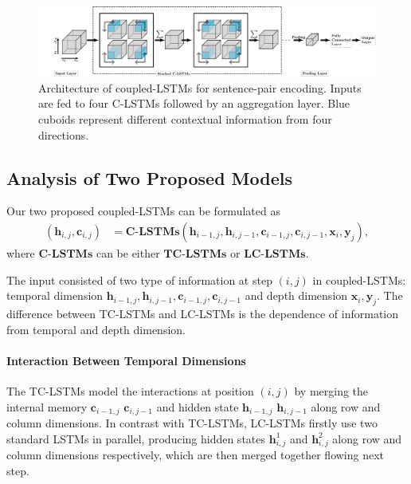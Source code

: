 \documentclass{article}
\def\h{\mathbf{h}}
\def\bx{\mathbf{x}}
\def\by{\mathbf{y}}
\def\cc{\mathbf{c}}
\def\ii{\mathbf{i}}
\def\ff{\mathbf{f}}
\def\oo{\mathbf{o}}
\def\cc{\mathbf{c}}
\begin{document}

\begin{figure}[t]\centering
  \includegraphics[width=1\linewidth]{./standalone/cubic-8.pdf}

  \caption{Architecture of coupled-LSTMs for sentence-pair encoding. Inputs are fed to four C-LSTMs followed by an aggregation layer. Blue cuboids represent different contextual information from four directions.}\label{fig:arc-4}
\end{figure}



\subsection{Analysis of Two Proposed Models}
Our two proposed coupled-LSTMs can be formulated as
\small{
\begin{align}
(\h_{i,j},\cc_{i,j}) &= \textbf{C-LSTMs}(\h_{i-1,j},\h_{i,j-1},\cc_{i-1,j},\cc_{i,j-1},\bx_i,\by_j),
\end{align}
}
where $\textbf{C-LSTMs}$ can be either $\textbf{TC-LSTMs}$ or  $\textbf{LC-LSTMs}$.



 The input consisted of two type of information at step $(i,j)$ in coupled-LSTMs: temporal dimension
$\h_{i-1,j}, \h_{i,j-1}, \cc_{i-1,j}, \cc_{i,j-1}$ and depth dimension
$\mathbf{x}_i,\mathbf{y}_j$. The difference between TC-LSTMs and LC-LSTMs is the dependence of information from temporal and depth dimension.


\paragraph{Interaction Between Temporal Dimensions}
The TC-LSTMs model the interactions at position $(i,j)$ by merging the internal memory $\mathbf{c}_{i-1,j}$ $\mathbf{c}_{i,j-1}$ and hidden state $\mathbf{h}_{i-1,j}$ $\mathbf{h}_{i,j-1}$ along row and column dimensions. In contrast with TC-LSTMs, LC-LSTMs firstly use two standard LSTMs in parallel, producing hidden states $\mathbf{h}^1_{i,j}$ and $\mathbf{h}^2_{i,j}$ along row and column dimensions respectively, which are then merged together flowing next step.
\end{document}
